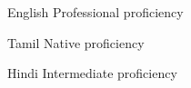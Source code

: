 
\begin{cvskills}

  \cvskill
    {English} %
    {Professional proficiency} %

  \cvskill
    {Tamil} %
    {Native proficiency} %
  

  \cvskill
    {Hindi} %
    {Intermediate proficiency} %

\end{cvskills}
